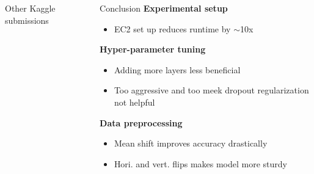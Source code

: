 \documentclass[20pt]{beamer}
\newlength{\twocolwid}
\newlength{\middlecolwid}
\begin{document}
\begin{frame}[t]
\begin{columns}[t]
\begin{column}{\twocolwid}
\begin{columns}[t,totalwidth=\twocolwid]
\begin{column}{\middlecolwid}
\begin{alertblock}{Other Kaggle submissions}
\end{alertblock}










\end{column} %


\begin{column}{\middlecolwid}\vspace{-.6in} %
\medskip
\bigskip
\bigskip
\bigskip
\bigskip
\bigskip
\bigskip
\bigskip
\begin{block}{Conclusion}
\textbf{Experimental setup}
\begin{itemize}
\bigskip
\item EC2 set up reduces runtime by $\sim$10x
\end{itemize}
\bigskip
\textbf{Hyper-parameter tuning }
\begin{itemize}
\bigskip
\item Adding more layers less beneficial
\item Too aggressive and too meek dropout regularization not helpful
\end{itemize}
\bigskip
\textbf{Data preprocessing}
\begin{itemize}
\bigskip
\item Mean shift improves accuracy drastically
\item Hori. and vert. flips makes model more sturdy
\end{itemize}


\end{block}
\end{column}
\end{columns}
\end{column}
\end{columns}
\end{frame}
\end{document}
